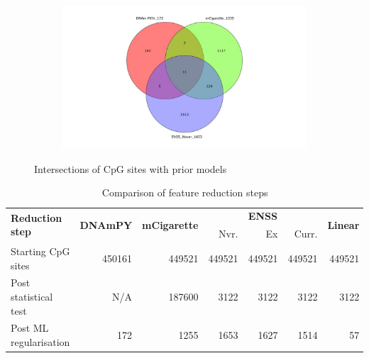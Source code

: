 \documentclass{article} %
\begin{document}
\begin{figure}[p]
    \begin{subfigure}{0.49\linewidth}
        \centering
        \includegraphics[width=\linewidth, trim=7cm 0cm 7cm 0cm, clip]{venn_diagrams/intersect_compare_never.jpg}
    \end{subfigure}
    \caption[Intersections of CpG sites with prior models]{Intersections of CpG sites with prior models}
    \label{fig:cpg-intersection-external}
\end{figure}

\begin{table}[p]
    \caption{Comparison of feature reduction steps} \label{table:sites-used}
    \begin{tabularx}{\textwidth}{X r r r r r r}
        \toprule
        \multirow{2}{*}{\textbf{Reduction step}} & \multirow{2}{*}{\textbf{DNAmPY}} & \multirow{2}{*}{\textbf{mCigarette}} & \multicolumn{3}{c}{\textbf{ENSS}} & \multirow{2}{*}{\textbf{Linear}}                               \\
        \cmidrule(lr){4-6}
                                                 &                                  &                                      & Nvr.                              & Ex                               & Curr.        &              \\
        \midrule
        Starting CpG sites                       & \num{450161}                     & \num{449521}                         & \num{449521}                      & \num{449521}                     & \num{449521} & \num{449521} \\
        \addlinespace
        Post statistical test                    & N/A                              & \num{187600}                         & \num{3122}                        & \num{3122}                       & \num{3122}   & \num{3122}   \\
        \addlinespace
        Post ML regularisation                   & \num{172}                        & \num{1255}                           & \num{1653}                        & \num{1627}                       & \num{1514}   & \num{57}     \\
        \bottomrule
    \end{tabularx}
\end{table}
\end{document}
